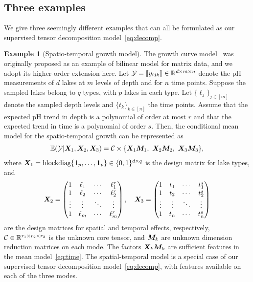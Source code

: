 \documentclass[12pt]{article}
\theoremstyle{definition}
\theoremstyle{definition}
\newtheorem{example}{Example}
\begin{document}
\subsection{Three examples}
We give three seemingly different examples that can all be formulated as our supervised tensor decomposition model~\eqref{eq:decomp}.
\begin{example}[Spatio-temporal growth model]
The growth curve model~\citep{gabriel1998generalised} was originally proposed as an example of bilinear model for matrix data, and we adopt its higher-order extension here. Let $\mathcal{Y}=\llbracket y_{ijk} \rrbracket\in\mathbb{R}^{d \times m\times n}$ denote the pH measurements of $d$ lakes at $m$ levels of depth and for $n$ time points. Suppose the sampled lakes belong to $q$ types, with $p$ lakes in each type. Let $\{\ell_j\}_{j\in[m]}$ denote the sampled depth levels and $\{t_k\}_{k\in[n]}$ the time points. Assume that the expected pH trend in depth is a polynomial of order at most $r$ and that the expected trend in time is a polynomial of order $s$. Then, the conditional mean model for the spatio-temporal growth can be represented as
\begin{equation}\label{eq:time}
\mathbb{E}(\tY|\mX_1,\mX_2,\mX_3)=\tC\times\{\mX_1\mM_1,\ \mX_2\mM_2,\ \mX_3\mM_3\},
\end{equation}
where $\bm X_1=\text{blockdiag}\{\mathbf{1}_p,\ldots,\mathbf{1}_p\}\in \{0,1\}^{d\times q}$ is the design matrix for lake types, and
\[
\bm X_2=
\begin{pmatrix}
1 & \ell_1&\cdots &\ell^{r}_1\\
1 & \ell_2&\cdots &\ell^{r}_2\\
\vdots &\vdots&\ddots&\vdots\\
1&\ell_{m}&\cdots&\ell^{r}_{m}
\end{pmatrix},\quad
\bm X_3=
\begin{pmatrix}
1 & t_1&\cdots &t^{s}_1\\
1 & t_2&\cdots &t^{s}_2\\
\vdots &\vdots&\ddots&\vdots\\
1&t_{n}&\cdots&t^{s}_{n}
\end{pmatrix}
\]
are the design matrices for spatial and temporal effects, respectively, $\mathcal{C}\in\mathbb{R}^{r_1\times r_2\times r_3}$ is the unknown core tensor, and $\bm M_k$ are unknown dimension reduction matrices on each mode. The factors $\bm X_k\bm M_k$ are sufficient features in the mean model~\eqref{eq:time}. The spatial-temporal model is a special case of our supervised tensor decomposition model~\eqref{eq:decomp}, with features available on each of the three modes.
\end{example}
\end{document}
